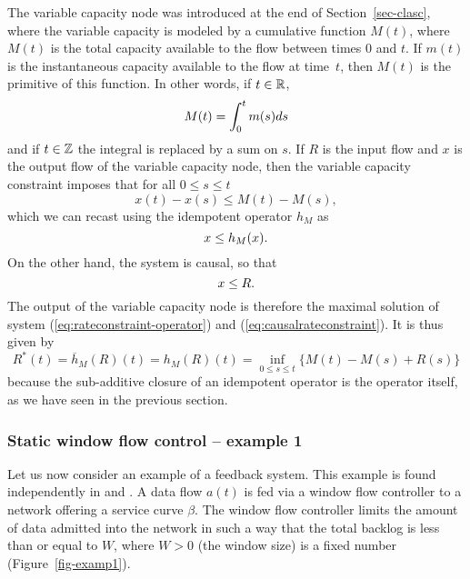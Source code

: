 The variable capacity node was introduced at the end of Section~\ref{sec-clasc}, where
the variable capacity is modeled by a cumulative function $M(t)$, where $M(t)$ is the total
capacity available to the flow between times $0$ and $t$. If $m(t)$ is the instantaneous
capacity available to the flow at time~$t$, then  $M(t)$ is the primitive of this function.
In other words, if $t \in \mathbb{R}$,
\begin{equation}
\mylabel{eq:rateprimitivereals}
M(t) = \int_0^t m(s) ds
\end{equation}
and if $t \in \mathbb{Z}$ the integral is replaced by a sum on $s$. If $R$ is the input flow and $x$
is the output flow of the variable capacity node, then the variable capacity constraint imposes that
for all $0 \leq s \leq t$
$$x(t) - x(s) \leq M(t) - M(s), $$
which we can recast using the idempotent operator $h_M$ as
\begin{equation}
\mylabel{eq:rateconstraint-operator}
x \leq h_{M}(x).
\end{equation}
On the other hand, the system is causal, so that
\begin{equation}
\mylabel{eq:causalrateconstraint}
x \leq R.
\end{equation}
The output of the variable capacity node is therefore the maximal solution of system (\ref{eq:rateconstraint-operator}) and  (\ref{eq:causalrateconstraint}). It is thus given by
$$ R^*(t) = \overline{h}_{M}(R)(t) = h_M(R)(t) = \inf_{0 \leq s \leq t} \{M(t) - M(s) + R(s)\} $$
because the sub-additive closure of an idempotent operator is the
operator itself, as we have seen in the previous section.


\subsubsection{Static window flow control -- example 1}

Let us now consider an example of a feedback system. This example
is found independently in \cite{cha96} and \cite{AR96,cru99}. A
data flow $a(t)$ is fed via a window flow controller to a network
offering a service curve $\beta$. The window flow controller
limits the amount of data admitted into the network in such a way
that the total backlog is less than or equal to $W$, where $W > 0$
(the window size) is a fixed number (Figure~\ref{fig-examp1}).

